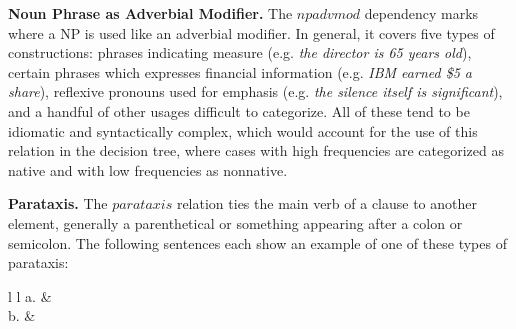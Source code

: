 \documentclass[main.tex]{subfiles}
\begin{document}

\textbf{Noun Phrase as Adverbial Modifier.} The $npadvmod$ dependency marks where a NP is used like an adverbial modifier. In general, it covers five types of constructions: phrases indicating measure (e.g. \textit{the director is 65 years old}), certain phrases which expresses financial information (e.g. \textit{IBM earned \$5 a share}), reflexive pronouns used for emphasis (e.g. \textit{the silence itself is significant}), and a handful of other usages difficult to categorize. All of these tend to be idiomatic and syntactically complex, which would account for the use of this relation in the decision tree, where cases with high frequencies are categorized as native and with low frequencies as nonnative.


\textbf{Parataxis.} The $parataxis$ relation ties the main verb of a clause to another element, generally a parenthetical or something appearing after a colon or semicolon. The following sentences \citep[p. 921]{typed-deps-manual,quirk:1985} each show an example of one of these types of parataxis:
\newline\newline\begin{tabular}{ l l }
a. & \\
b. & \\
\end{tabular}
\newline
\end{document}
